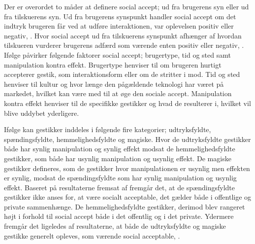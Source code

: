 %
Der er overordet to måder at definere social accept; ud fra brugerens syn eller ud fra tilskuerens syn. Ud fra brugerens synspunkt handler social accept om det indtryk brugeren får ved at udføre interaktionen, var oplevelsen positiv eller negativ, \parencite[s. 276]{PDF:WouldYouDoThat}. Hvor social accept ud fra tilskuerens synspunkt afhænger af hvordan tilskueren vurderer brugerens adfærd som værende enten positiv eller negativ, \parencite[s. 276]{PDF:WouldYouDoThat}. Ifølge \textcite[s. 276]{PDF:WouldYouDoThat} påvirker følgende faktorer social accept; brugertype, tid og sted samt manipulation kontra effekt. Brugertype henviser til om brugeren hurtigt accepterer gestik, som interaktionsform eller om de stritter i mod. Tid og sted henviser til kultur og hvor længe den pågældende teknologi har været på markedet, hvilket kan være med til at øge den sociale accept. Manipulation kontra effekt henviser til de specifikke gestikker og hvad de resulterer i, hvilket vil blive uddybet yderligere.

Ifølge \textcite[s. 276]{PDF:WouldYouDoThat} kan gestikker inddeles i følgende fire kategorier; udtryksfyldte, spændingsfyldte, hemmelighedsfyldte og magiske. Hvor de udtryksfyldte gestikker både har synlig manipulation og synlig effekt modsat de hemmelighedsfyldte gestikker, som både har usynlig manipulation og usynlig effekt. De magiske gestikker defineres, som de gestikker hvor manipulationen er usynlig men effekten er synlig, modsat de spændingsfyldte som har synlig manipulation og usynlig effekt. Baseret på resultaterne fremsat af \textcite[s. 277]{PDF:WouldYouDoThat} fremgår det, at de spændingsfyldte gestikker ikke anses for, at være socialt acceptable, det gælder både i offentlige og private sammenhænge. De hemmelighedsfyldte gestikker, derimod blev rangeret højt i forhold til social accept både i det offentlig og i det private. Ydermere fremgår det ligeledes af resultaterne, at både de udtryksfyldte og magiske gestikke generelt opleves, som værende social acceptable, \parencite[s. 277]{PDF:WouldYouDoThat}. 

